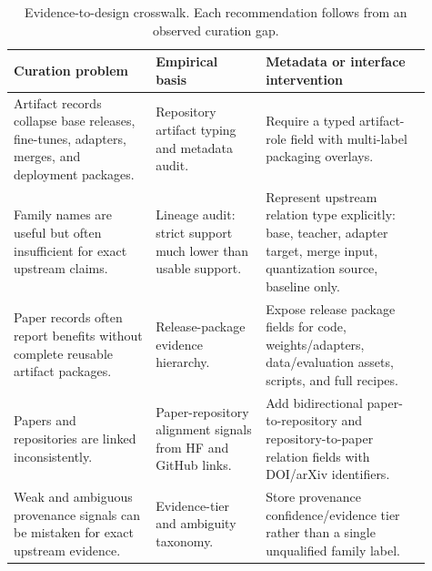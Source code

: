 \begin{table}[t]
\centering
\caption{Evidence-to-design crosswalk. Each recommendation follows from an observed curation gap.}
\label{tab:crosswalk}
\small
\begin{tabular}{p{0.31\linewidth}p{0.24\linewidth}p{0.36\linewidth}}
\toprule
Curation problem & Empirical basis & Metadata or interface intervention \\
\midrule
Artifact records collapse base releases, fine-tunes, adapters, merges, and deployment packages. & Repository artifact typing and metadata audit. & Require a typed artifact-role field with multi-label packaging overlays. \\
Family names are useful but often insufficient for exact upstream claims. & Lineage audit: strict support much lower than usable support. & Represent upstream relation type explicitly: base, teacher, adapter target, merge input, quantization source, baseline only. \\
Paper records often report benefits without complete reusable artifact packages. & Release-package evidence hierarchy. & Expose release package fields for code, weights/adapters, data/evaluation assets, scripts, and full recipes. \\
Papers and repositories are linked inconsistently. & Paper-repository alignment signals from HF and GitHub links. & Add bidirectional paper-to-repository and repository-to-paper relation fields with DOI/arXiv identifiers. \\
Weak and ambiguous provenance signals can be mistaken for exact upstream evidence. & Evidence-tier and ambiguity taxonomy. & Store provenance confidence/evidence tier rather than a single unqualified family label. \\
\bottomrule
\end{tabular}
\end{table}
